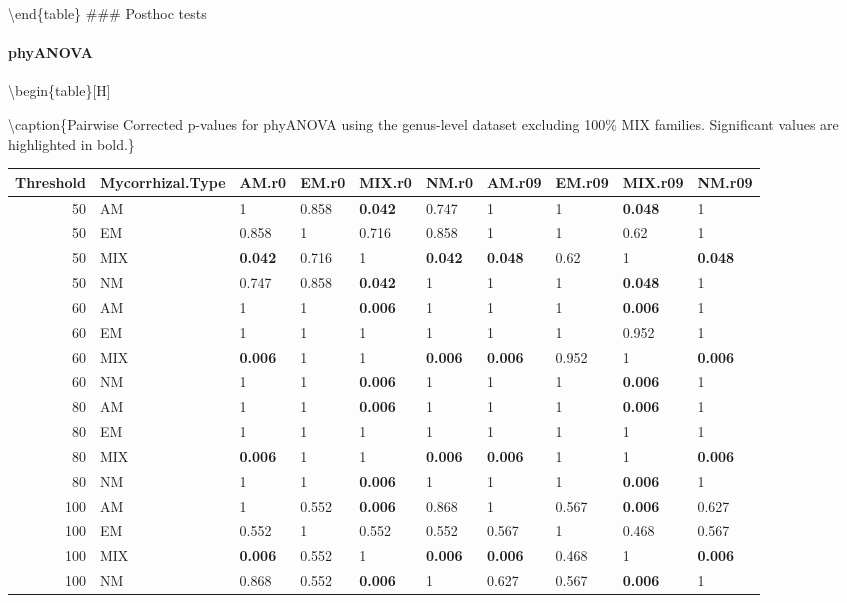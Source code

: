 \documentclass[]{article}
\let\oldparagraph\paragraph
\renewcommand{\paragraph}[1]{\oldparagraph{#1}\mbox{}}
\begin{document}
\textbackslash end\{table\} \#\#\# Posthoc tests

\hypertarget{phyanova-5}{%
\paragraph{phyANOVA}\label{phyanova-5}}

\textbackslash begin\{table\}{[}H{]}

\textbackslash caption\{\label{tab:unnamed-chunk-26}Pairwise Corrected
p-values for phyANOVA using the genus-level dataset excluding 100\% MIX
families. Significant values are highlighted in bold.\} \centering

\begin{tabular}{r|l|l|l|l|l|l|l|l|l}
\hline
Threshold & Mycorrhizal.Type & AM.r0 & EM.r0 & MIX.r0 & NM.r0 & AM.r09 & EM.r09 & MIX.r09 & NM.r09\\
\hline
50 & AM & 1 & 0.858 & \textbf{0.042} & 0.747 & 1 & 1 & \textbf{0.048} & 1\\
\hline
50 & EM & 0.858 & 1 & 0.716 & 0.858 & 1 & 1 & 0.62 & 1\\
\hline
50 & MIX & \textbf{0.042} & 0.716 & 1 & \textbf{0.042} & \textbf{0.048} & 0.62 & 1 & \textbf{0.048}\\
\hline
50 & NM & 0.747 & 0.858 & \textbf{0.042} & 1 & 1 & 1 & \textbf{0.048} & 1\\
\hline
60 & AM & 1 & 1 & \textbf{0.006} & 1 & 1 & 1 & \textbf{0.006} & 1\\
\hline
60 & EM & 1 & 1 & 1 & 1 & 1 & 1 & 0.952 & 1\\
\hline
60 & MIX & \textbf{0.006} & 1 & 1 & \textbf{0.006} & \textbf{0.006} & 0.952 & 1 & \textbf{0.006}\\
\hline
60 & NM & 1 & 1 & \textbf{0.006} & 1 & 1 & 1 & \textbf{0.006} & 1\\
\hline
80 & AM & 1 & 1 & \textbf{0.006} & 1 & 1 & 1 & \textbf{0.006} & 1\\
\hline
80 & EM & 1 & 1 & 1 & 1 & 1 & 1 & 1 & 1\\
\hline
80 & MIX & \textbf{0.006} & 1 & 1 & \textbf{0.006} & \textbf{0.006} & 1 & 1 & \textbf{0.006}\\
\hline
80 & NM & 1 & 1 & \textbf{0.006} & 1 & 1 & 1 & \textbf{0.006} & 1\\
\hline
100 & AM & 1 & 0.552 & \textbf{0.006} & 0.868 & 1 & 0.567 & \textbf{0.006} & 0.627\\
\hline
100 & EM & 0.552 & 1 & 0.552 & 0.552 & 0.567 & 1 & 0.468 & 0.567\\
\hline
100 & MIX & \textbf{0.006} & 0.552 & 1 & \textbf{0.006} & \textbf{0.006} & 0.468 & 1 & \textbf{0.006}\\
\hline
100 & NM & 0.868 & 0.552 & \textbf{0.006} & 1 & 0.627 & 0.567 & \textbf{0.006} & 1\\
\hline
\end{tabular}
\end{document}
